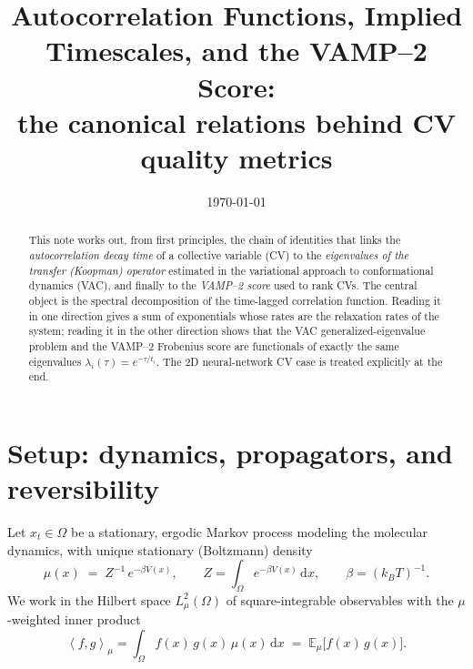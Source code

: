 \documentclass[11pt]{article}
\title{\bf Autocorrelation Functions, Implied Timescales, and the VAMP--2 Score:\\
the canonical relations behind CV quality metrics}
\author{}
\date{\today}
\theoremstyle{plain}
\theoremstyle{definition}
\newcommand{\inner}[2]{\left\langle #1 , #2 \right\rangle_{\mu}}
\newcommand{\E}{\mathbb{E}}
\newcommand{\dd}{\,\mathrm{d}}
\begin{document}
\maketitle

\begin{abstract}
This note works out, from first principles, the chain of identities that links the
\emph{autocorrelation decay time} of a collective variable (CV) to the
\emph{eigenvalues of the transfer (Koopman) operator} estimated in the variational
approach to conformational dynamics (VAC), and finally to the \emph{VAMP--2 score}
used to rank CVs. The central object is the spectral decomposition of the
time-lagged correlation function. Reading it in one direction gives a sum of
exponentials whose rates are the relaxation rates of the system; reading it in the
other direction shows that the VAC generalized-eigenvalue problem and the VAMP--2
Frobenius score are functionals of exactly the same eigenvalues
$\lambda_i(\tau)=e^{-\tau/t_i}$. The 2D neural-network CV case is treated explicitly
at the end.
\end{abstract}

\tableofcontents

\section{Setup: dynamics, propagators, and reversibility}

Let $x_t\in\Omega$ be a stationary, ergodic Markov process modeling the molecular
dynamics, with unique stationary (Boltzmann) density
\begin{equation}
\mu(x)\;=\;Z^{-1}\,e^{-\beta V(x)},\qquad
Z=\int_\Omega e^{-\beta V(x)}\dd x ,\qquad \beta=(k_BT)^{-1}.
\end{equation}
We work in the Hilbert space $L^2_\mu(\Omega)$ of square-integrable observables with
the $\mu$-weighted inner product
\begin{equation}
\inner{f}{g}=\int_\Omega f(x)\,g(x)\,\mu(x)\dd x
\;=\;\E_{\mu}\!\big[f(x)\,g(x)\big].
\end{equation}
\end{document}
